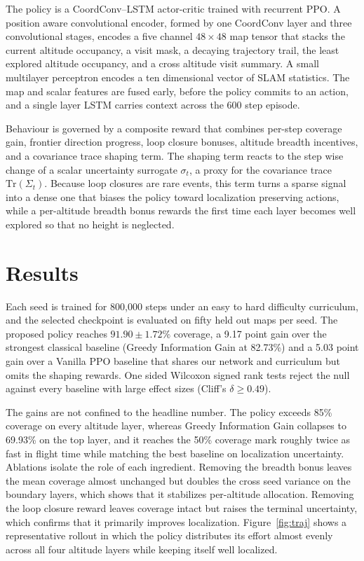 \documentclass[runningheads]{llncs}
\begin{document}
The policy is a CoordConv--LSTM actor-critic trained with recurrent PPO. A position aware convolutional encoder, formed by one CoordConv layer and three convolutional stages, encodes a five channel $48\times48$ map tensor that stacks the current altitude occupancy, a visit mask, a decaying trajectory trail, the least explored altitude occupancy, and a cross altitude visit summary. A small multilayer perceptron encodes a ten dimensional vector of SLAM statistics. The map and scalar features are fused early, before the policy commits to an action, and a single layer LSTM carries context across the 600 step episode.

Behaviour is governed by a composite reward that combines per-step coverage gain, frontier direction progress, loop closure bonuses, altitude breadth incentives, and a covariance trace shaping term. The shaping term reacts to the step wise change of a scalar uncertainty surrogate $\sigma_t$, a proxy for the covariance trace $\mathrm{Tr}(\Sigma_t)$. Because loop closures are rare events, this term turns a sparse signal into a dense one that biases the policy toward localization preserving actions, while a per-altitude breadth bonus rewards the first time each layer becomes well explored so that no height is neglected.

\section{Results}

Each seed is trained for 800{,}000 steps under an easy to hard difficulty curriculum, and the selected checkpoint is evaluated on fifty held out maps per seed. The proposed policy reaches $91.90 \pm 1.72\%$ coverage, a 9.17 point gain over the strongest classical baseline (Greedy Information Gain at 82.73\%) and a 5.03 point gain over a Vanilla PPO baseline that shares our network and curriculum but omits the shaping rewards. One sided Wilcoxon signed rank tests reject the null against every baseline with large effect sizes (Cliff's $\delta \geq 0.49$).

The gains are not confined to the headline number. The policy exceeds 85\% coverage on every altitude layer, whereas Greedy Information Gain collapses to 69.93\% on the top layer, and it reaches the 50\% coverage mark roughly twice as fast in flight time while matching the best baseline on localization uncertainty. Ablations isolate the role of each ingredient. Removing the breadth bonus leaves the mean coverage almost unchanged but doubles the cross seed variance on the boundary layers, which shows that it stabilizes per-altitude allocation. Removing the loop closure reward leaves coverage intact but raises the terminal uncertainty, which confirms that it primarily improves localization. Figure~\ref{fig:traj} shows a representative rollout in which the policy distributes its effort almost evenly across all four altitude layers while keeping itself well localized.
\end{document}
